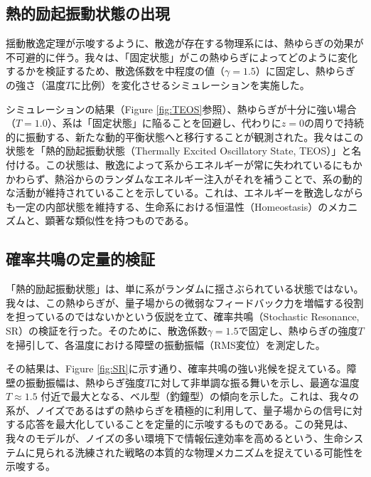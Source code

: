 \documentclass[a4paper,11pt,ja=standard,lualatex]{bxjsarticle}
\begin{document}
\subsection{熱的励起振動状態の出現}
揺動散逸定理が示唆するように、散逸が存在する物理系には、熱ゆらぎの効果が不可避的に伴う。我々は、「固定状態」がこの熱ゆらぎによってどのように変化するかを検証するため、散逸係数を中程度の値（$\gamma=1.5$）に固定し、熱ゆらぎの強さ（温度$T$に比例）を変化させるシミュレーションを実施した。

シミュレーションの結果（Figure \ref{fig:TEOS}参照）、熱ゆらぎが十分に強い場合（$T=1.0$）、系は「固定状態」に陥ることを回避し、代わりに$z=0$の周りで持続的に振動する、新たな動的平衡状態へと移行することが観測された。我々はこの状態を「熱的励起振動状態（Thermally Excited Oscillatory State, TEOS）」と名付ける。この状態は、散逸によって系からエネルギーが常に失われているにもかかわらず、熱浴からのランダムなエネルギー注入がそれを補うことで、系の動的な活動が維持されていることを示している。これは、エネルギーを散逸しながらも一定の内部状態を維持する、生命系における恒温性（Homeostasis）のメカニズムと、顕著な類似性を持つものである。

\subsection{確率共鳴の定量的検証}
「熱的励起振動状態」は、単に系がランダムに揺さぶられている状態ではない。我々は、この熱ゆらぎが、量子場からの微弱なフィードバック力を増幅する役割を担っているのではないかという仮説を立て、確率共鳴（Stochastic Resonance, SR）の検証を行った。そのために、散逸係数$\gamma=1.5$で固定し、熱ゆらぎの強度$T$を掃引して、各温度における障壁の振動振幅（RMS変位）を測定した。

その結果は、Figure \ref{fig:SR}に示す通り、確率共鳴の強い兆候を捉えている。障壁の振動振幅は、熱ゆらぎ強度$T$に対して非単調な振る舞いを示し、最適な温度 $T \approx 1.5$ 付近で最大となる、ベル型（釣鐘型）の傾向を示した。これは、我々の系が、ノイズであるはずの熱ゆらぎを積極的に利用して、量子場からの信号に対する応答を最大化していることを定量的に示唆するものである。この発見は、我々のモデルが、ノイズの多い環境下で情報伝達効率を高めるという、生命システムに見られる洗練された戦略の本質的な物理メカニズムを捉えている可能性を示唆する。

\end{document}
